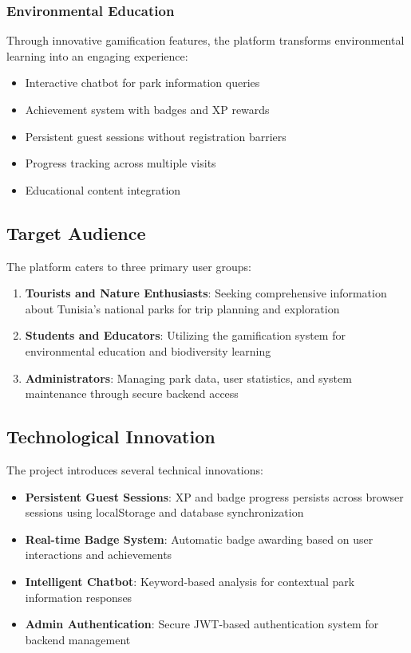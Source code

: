 \documentclass[11pt,a4paper]{article}
\begin{document}
\subsubsection{Environmental Education}
Through innovative gamification features, the platform transforms environmental learning into an engaging experience:
\begin{itemize}
    \item Interactive chatbot for park information queries
    \item Achievement system with badges and XP rewards
    \item Persistent guest sessions without registration barriers
    \item Progress tracking across multiple visits
    \item Educational content integration
\end{itemize}

\subsection{Target Audience}

The platform caters to three primary user groups:

\begin{enumerate}
    \item \textbf{Tourists and Nature Enthusiasts}: Seeking comprehensive information about Tunisia's national parks for trip planning and exploration
    \item \textbf{Students and Educators}: Utilizing the gamification system for environmental education and biodiversity learning
    \item \textbf{Administrators}: Managing park data, user statistics, and system maintenance through secure backend access
\end{enumerate}

\subsection{Technological Innovation}

The project introduces several technical innovations:

\begin{itemize}
    \item \textbf{Persistent Guest Sessions}: XP and badge progress persists across browser sessions using localStorage and database synchronization
    \item \textbf{Real-time Badge System}: Automatic badge awarding based on user interactions and achievements
    \item \textbf{Intelligent Chatbot}: Keyword-based analysis for contextual park information responses
    \item \textbf{Admin Authentication}: Secure JWT-based authentication system for backend management
\end{itemize}
\end{document}
